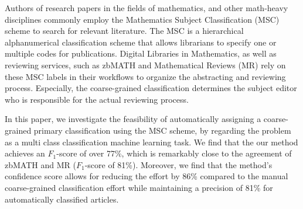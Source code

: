 Authors of research papers in the fields of mathematics, and other math-heavy disciplines commonly employ the Mathematics Subject
Classification (MSC) scheme to search for relevant literature.
The MSC is a hierarchical alphanumerical classification scheme that allows librarians to specify one or multiple codes for publications.
Digital Libraries in Mathematics, as well as reviewing services, such as zbMATH and Mathematical Reviews (MR) rely on these MSC labels in their workflows to organize the abstracting and reviewing process.
Especially, the coarse-grained classification determines the subject editor who is responsible for the actual reviewing process.

In this paper, we investigate the feasibility of automatically assigning a coarse-grained primary classification using the MSC scheme, by regarding the problem as a multi class classification machine learning task.
We find that the our method achieves an \(F_{1}\)-score of over 77\%, which is remarkably close to the agreement of zbMATH and MR (\(F_{1}\)-score of 81\%).
Moreover, we find that the method's confidence score allows for reducing the effort by 86\% compared to the manual coarse-grained classification effort while maintaining a precision of 81\% for automatically classified articles.
